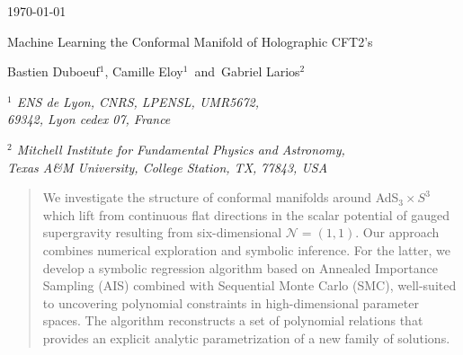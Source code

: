 \documentclass[11pt,a4paper]{article}
\begin{document}
\begin{titlepage}



\begin{flushright}

\today
\end{flushright}


\vspace{25pt}

   
   \begin{center}
   \baselineskip=16pt

{\Large Machine Learning the Conformal Manifold of Holographic CFT2’s}


   		
\vspace{25pt}
		

{\large  Bastien Duboeuf$^{1}$, Camille Eloy$^{1}$ \,and\, Gabriel Larios$^{2}$}
		
\vspace{25pt}
		
		
	\begin{small}

	{\it $^{1}$ ENS de Lyon, CNRS, LPENSL, UMR5672,\\ 69342, Lyon cedex 07, France}  \\


	\vspace{10pt}
	
	{\it $^{2}$ Mitchell Institute for Fundamental Physics and Astronomy, \\
	Texas A\&M University, College Station, TX, 77843, USA}     \\
		
	\end{small}
		

\vskip 50pt

\end{center}

\begin{abstract}
	We investigate the structure of conformal manifolds around AdS$_3 \times S^3$ which lift from continuous flat directions in the scalar potential of gauged supergravity resulting from six-dimensional $\mathcal{N}=(1,1)$.
	Our approach combines numerical exploration and symbolic inference. For the latter, we develop a symbolic regression algorithm based on Annealed Importance Sampling (AIS) combined with Sequential Monte Carlo (SMC), well-suited to uncovering polynomial constraints in high-dimensional parameter spaces. 
	The algorithm reconstructs a set of polynomial relations that provides an explicit analytic parametrization of a new family of solutions. 
\end{abstract}


\vfill

\end{titlepage}
\end{document}
